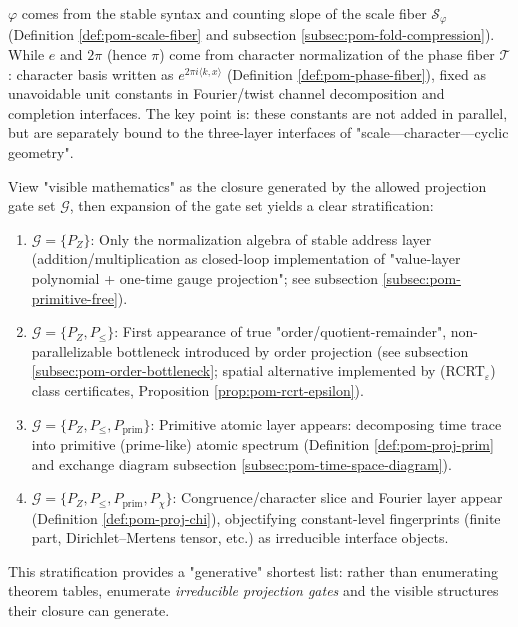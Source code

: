 \begin{remark}\label{rem:pom-constants-levels}
\(\varphi\) comes from the stable syntax and counting slope of the scale fiber \(\mathcal S_\varphi\) (Definition \ref{def:pom-scale-fiber} and subsection \ref{subsec:pom-fold-compression}).
While \(e\) and \(2\pi\) (hence \(\pi\)) come from character normalization of the phase fiber \(\mathcal T\): character basis written as \(e^{2\pi i\langle k,x\rangle}\) (Definition \ref{def:pom-phase-fiber}), fixed as unavoidable unit constants in Fourier/twist channel decomposition and completion interfaces.
The key point is: these constants are not added in parallel, but are separately bound to the three-layer interfaces of "scale—character—cyclic geometry".
\end{remark}

\begin{remark}\label{rem:pom-projection-gate-stratification}
View "visible mathematics" as the closure generated by the allowed projection gate set \(\mathcal{G}\), then expansion of the gate set yields a clear stratification:
\begin{enumerate}
  \item \(\mathcal{G}=\{P_Z\}\): Only the normalization algebra of stable address layer (addition/multiplication as closed-loop implementation of "value-layer polynomial + one-time gauge projection"; see subsection \ref{subsec:pom-primitive-free}).
  \item \(\mathcal{G}=\{P_Z,P_{\le}\}\): First appearance of true "order/quotient-remainder", non-parallelizable bottleneck introduced by order projection (see subsection \ref{subsec:pom-order-bottleneck}; spatial alternative implemented by (RCRT\(_\varepsilon\)) class certificates, Proposition \ref{prop:pom-rcrt-epsilon}).
  \item \(\mathcal{G}=\{P_Z,P_{\le},P_{\mathrm{prim}}\}\): Primitive atomic layer appears: decomposing time trace into primitive (prime-like) atomic spectrum (Definition \ref{def:pom-proj-prim} and exchange diagram subsection \ref{subsec:pom-time-space-diagram}).
  \item \(\mathcal{G}=\{P_Z,P_{\le},P_{\mathrm{prim}},P_\chi\}\): Congruence/character slice and Fourier layer appear (Definition \ref{def:pom-proj-chi}), objectifying constant-level fingerprints (finite part, Dirichlet–Mertens tensor, etc.) as irreducible interface objects.
\end{enumerate}
This stratification provides a "generative" shortest list: rather than enumerating theorem tables, enumerate \emph{irreducible projection gates} and the visible structures their closure can generate.
\end{remark}

